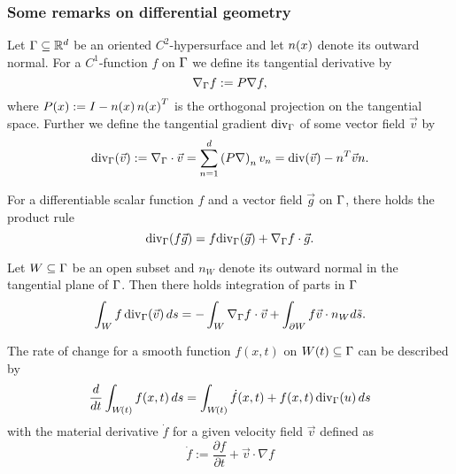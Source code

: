 \subsubsection{Some remarks on differential geometry}
Let $\Gamma\subseteq\mathbb{R}^d$ be an oriented $C^2$-hypersurface and let $n\!\left(x\right)$ denote its outward normal.
For a $C^1$-function $f$ on $\Gamma$ we define its tangential derivative by
\begin{equation}
	\nabla_\Gamma f:=P\nabla f,
\end{equation}
where $P\!\left(x\right):=I-n\!\left(x\right)n\!\left(x\right)^T$ is the orthogonal projection on the tangential space. Further we define the tangential gradient $\text{div}_\Gamma$ of some vector field  $\vec v$ by
\begin{equation}
	\text{div}_\Gamma\!\left(\vec v\right):=\nabla_\Gamma \cdot \vec v=\sum_{n=1}^d \left(P\nabla\right)_n v_n=\text{div}\!\left(\vec v\right) - n^T\vec v n.
\end{equation}
\begin{rmk}
	For a differentiable scalar function $f$ and a vector field $\vec g$ on $\Gamma$, there holds the product rule
	\begin{equation}
		\textrm{div}_\Gamma\!\left(f\vec g\right)=f\mathrm{div}_\Gamma\!\left(\vec g\right)+\nabla_\Gamma f\cdot \vec g.
	\end{equation}
\end{rmk}
\begin{rmk}
	Let $W\subseteq\Gamma$ be an open subset and $n_W$ denote its outward normal in the tangential plane of $\Gamma$. Then there holds integration of parts in $\Gamma$
	\begin{equation}
		\int_Wf\,\mathrm{div}_\Gamma\!\left(\vec v\right)ds=-\int_W\nabla_\Gamma f\cdot\vec v+\int_{\partial W}f \vec v \cdot n_W d\tilde s.
	\end{equation}
\end{rmk}

\begin{thm}
The rate of change for a smooth function $f(x,t)$ on $W\!\left(t\right)\subseteq \Gamma$ can be described by
\begin{equation}
	\frac{d}{dt}\int_{W\!\left(t\right)}f\!\left(x,t\right)ds=\int_{W\!\left(t\right)}\dot f\!\left(x,t\right)+f\!\left(x,t\right)\mathrm{div}_\Gamma\!\left(u\right)ds
\end{equation}
with the material derivative $\dot f$ for a given velocity field $\vec v$ defined as
\begin{equation}
\dot f:=\frac{\partial f}{\partial t}+\vec v\cdot\nabla f
\end{equation}
\end{thm}
